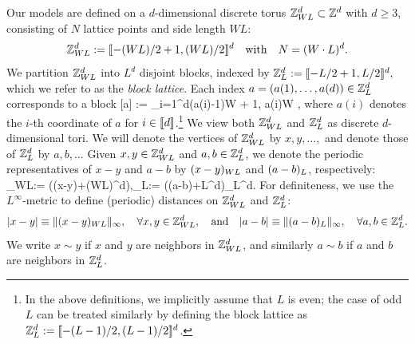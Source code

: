 Our models are defined on a $d$-dimensional discrete torus \({\mathbb Z}_{WL}^d\subset\mathbb{Z}^d\) with $d\ge 3$, consisting of $N$ lattice points and side length $WL$:
\[{\mathbb Z}_{WL}^d:=\llbracket{ -(WL)/2+1 , (WL)/2}\rrbracket^d\quad \text{with}\quad N=(W\cdot L)^d.\] 
We partition ${\mathbb Z}_{WL}^d$ into $L^d$ disjoint blocks, indexed by \({\mathbb Z}_L^d:=\llbracket{ -L/2+1 , L/2}\rrbracket^d,\)
which we refer to as the \emph{block lattice}.  Each index $a=(a(1),\ldots, a(d))\in {\mathbb Z}_L^d$ corresponds to a block 
\be\label{eq:blockIa}
[a] := \prod_{i=1}^d\left\llbracket (a(i)-1)W + 1, \; a(i)W \right\rrbracket, 
\ee
where $a(i)$ denotes the $i$-th coordinate of $a$ for $i\in\llbracket{d}\rrbracket$.\footnote{In the above definitions, we implicitly assume that $L$ is even; the case of odd $L$ can be treated similarly by defining the block lattice as $ {\mathbb Z}_L^d:=\llbracket{ -(L-1)/2 , (L-1)/2}\rrbracket^d$.}
We view both ${\mathbb Z}_{WL}^d$ and ${\mathbb Z}_L^d$ as discrete $d$-dimensional tori. We will denote the vertices of ${\mathbb Z}_{WL}^d$ by $x,y,\ldots,$ and denote those of ${\mathbb Z}_L^d$ by $a,b,\ldots$ Given $x,y\in {\mathbb Z}_{WL}^d$ and $a,b\in {\mathbb Z}_L^d$, we denote the periodic representatives of $x-y$ and $a-b$ by
$({x-y})_{WL}$ and $({a-b})_L$, respectively:  
\be\label{representativeL}_{WL}:= \left((x-y)+(WL)\Z^d\right)\cap \ZL,\quad {}_L:= \left((a-b)+L\Z^d\right)\cap \Z_L^d.\ee
For definiteness, we use the $L^\infty$-metric to define (periodic) distances on ${\mathbb Z}_{WL}^d$ and ${\mathbb Z}_L^d$: 
\[ |x-y|\equiv \|({x-y})_{WL}\|_{\infty},\quad \forall x,y\in {\mathbb Z}_{WL}^d,\quad \text{and}\quad |a-b|\equiv \|({a-b})_L\|_{\infty},\quad \forall a,b\in {\mathbb Z}_L^d.\]
We write $x\sim y$ if $x$ and $y$ are neighbors in ${\mathbb Z}_{WL}^d$, and similarly $a\sim b$ if $a$ and $b$ are neighbors in ${\mathbb Z}_L^d$. 



